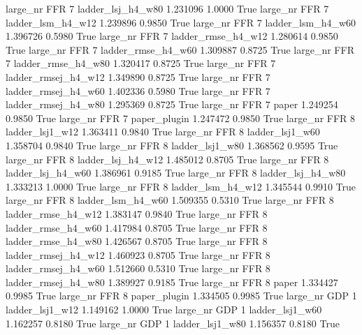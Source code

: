   large_nr      FFR                 7   ladder_lsj_h4_w80   1.231096      1.0000    True
  large_nr      FFR                 7   ladder_lsm_h4_w12   1.239896      0.9850    True
  large_nr      FFR                 7   ladder_lsm_h4_w60   1.396726      0.5980    True
  large_nr      FFR                 7  ladder_rmse_h4_w12   1.280614      0.9850    True
  large_nr      FFR                 7  ladder_rmse_h4_w60   1.309887      0.8725    True
  large_nr      FFR                 7  ladder_rmse_h4_w80   1.320417      0.8725    True
  large_nr      FFR                 7 ladder_rmsej_h4_w12   1.349890      0.8725    True
  large_nr      FFR                 7 ladder_rmsej_h4_w60   1.402336      0.5980    True
  large_nr      FFR                 7 ladder_rmsej_h4_w80   1.295369      0.8725    True
  large_nr      FFR                 7               paper   1.249254      0.9850    True
  large_nr      FFR                 7        paper_plugin   1.247472      0.9850    True
  large_nr      FFR                 8     ladder_lsj1_w12   1.363411      0.9840    True
  large_nr      FFR                 8     ladder_lsj1_w60   1.358704      0.9840    True
  large_nr      FFR                 8     ladder_lsj1_w80   1.368562      0.9595    True
  large_nr      FFR                 8   ladder_lsj_h4_w12   1.485012      0.8705    True
  large_nr      FFR                 8   ladder_lsj_h4_w60   1.386961      0.9185    True
  large_nr      FFR                 8   ladder_lsj_h4_w80   1.333213      1.0000    True
  large_nr      FFR                 8   ladder_lsm_h4_w12   1.345544      0.9910    True
  large_nr      FFR                 8   ladder_lsm_h4_w60   1.509355      0.5310    True
  large_nr      FFR                 8  ladder_rmse_h4_w12   1.383147      0.9840    True
  large_nr      FFR                 8  ladder_rmse_h4_w60   1.417984      0.8705    True
  large_nr      FFR                 8  ladder_rmse_h4_w80   1.426567      0.8705    True
  large_nr      FFR                 8 ladder_rmsej_h4_w12   1.460923      0.8705    True
  large_nr      FFR                 8 ladder_rmsej_h4_w60   1.512660      0.5310    True
  large_nr      FFR                 8 ladder_rmsej_h4_w80   1.389927      0.9185    True
  large_nr      FFR                 8               paper   1.334427      0.9985    True
  large_nr      FFR                 8        paper_plugin   1.334505      0.9985    True
  large_nr      GDP                 1     ladder_lsj1_w12   1.149162      1.0000    True
  large_nr      GDP                 1     ladder_lsj1_w60   1.162257      0.8180    True
  large_nr      GDP                 1     ladder_lsj1_w80   1.156357      0.8180    True
